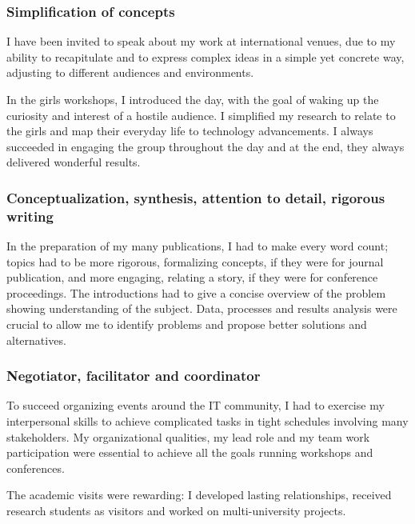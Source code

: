 \begin{minipage}{0.48\textwidth}

\subsubsection*{Simplification of concepts}
\vspace*{-0.2cm}


I have been invited to speak about my work at international venues,
due to my ability to recapitulate and to express complex ideas in a simple
yet concrete way, adjusting 
to different audiences and environments.

\vspace*{.1cm}

In the girls workshops, I introduced the day, with the goal of waking up
the curiosity and interest of a hostile audience.  I simplified my research
to relate to the girls and map their everyday life to technology
advancements. I always succeeded in engaging the group throughout the day
and at the end, they always delivered wonderful results.


\subsubsection*{Conceptualization, synthesis, attention to detail,
rigorous writing}
\vspace*{-0.2cm}


In the preparation of my many publications, I had to make every
word count; topics had to be more rigorous, formalizing concepts, if they
were for journal publication, and more engaging, relating a story, if they
were for conference proceedings. The introductions had to give a concise
overview of the problem showing understanding of the subject.
Data, processes and results analysis were
crucial to allow me to identify problems and propose better solutions and
alternatives.


\subsubsection*{Negotiator, facilitator and coordinator}
\vspace*{-0.2cm}

To succeed organizing events around the IT community,
I had to exercise my interpersonal skills to achieve
complicated tasks in tight schedules involving many stakeholders.
My organizational qualities, my lead role and my team work participation
were essential to achieve all the goals running workshops and conferences. 

\vspace*{.1cm}

The academic visits were rewarding:
I developed lasting relationships, received 
research students as visitors and worked on multi-university
projects.


\end{minipage}

